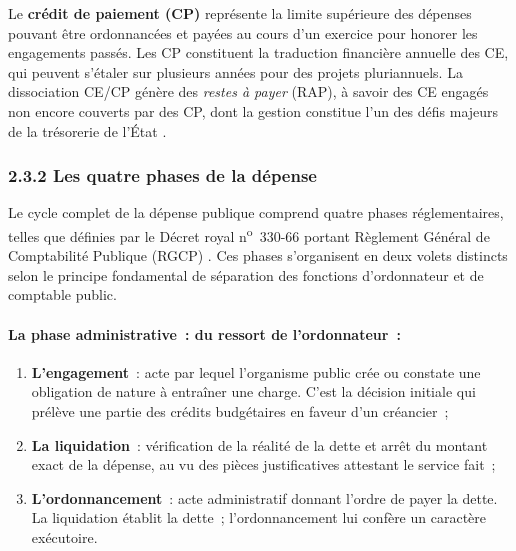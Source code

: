 Le \textbf{cr\'edit de paiement (CP)} repr\'esente la limite sup\'erieure des d\'epenses pouvant \^etre ordonnanc\'ees et pay\'ees au cours d'un exercice pour honorer les engagements pass\'es. Les CP constituent la traduction financi\`ere annuelle des CE, qui peuvent s'\'etaler sur plusieurs ann\'ees pour des projets pluriannuels. La dissociation CE/CP g\'en\`ere des \textit{restes \`a payer} (RAP), \`a savoir des CE engag\'es non encore couverts par des CP, dont la gestion constitue l'un des d\'efis majeurs de la tr\'esorerie de l'\'Etat \citep{Abdelali2019}.

\subsubsection*{2.3.2 \quad Les quatre phases de la d\'epense}

Le cycle complet de la d\'epense publique comprend quatre phases r\'eglementaires, telles que d\'efinies par le D\'ecret royal n\textsuperscript{o}~330-66 portant R\`eglement G\'en\'eral de Comptabilit\'e Publique (RGCP) \citep{RGCP1967}. Ces phases s'organisent en deux volets distincts selon le principe fondamental de s\'eparation des fonctions d'ordonnateur et de comptable public.

\paragraph{La phase administrative~: du ressort de l'ordonnateur~:}

\begin{enumerate}
    \item \textbf{L'engagement}~: acte par lequel l'organisme public cr\'ee ou constate une obligation de nature \`a entra\^iner une charge. C'est la d\'ecision initiale qui pr\'el\`eve une partie des cr\'edits budg\'etaires en faveur d'un cr\'eancier~;
    \item \textbf{La liquidation}~: v\'erification de la r\'ealit\'e de la dette et arr\^et du montant exact de la d\'epense, au vu des pi\`eces justificatives attestant le service fait~;
    \item \textbf{L'ordonnancement}~: acte administratif donnant l'ordre de payer la dette. La liquidation \'etablit la dette~; l'ordonnancement lui conf\`ere un caract\`ere ex\'ecutoire.
\end{enumerate}

